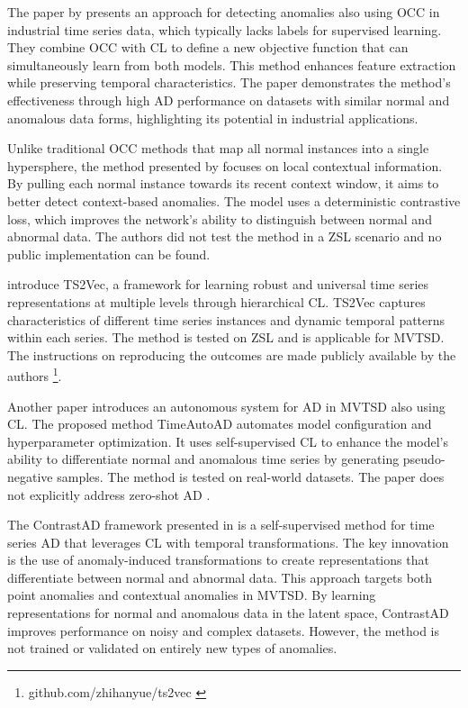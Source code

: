 %
The paper by \cite{lee_time_2023} presents an approach for detecting anomalies also using OCC in industrial time series data, which typically lacks labels for supervised learning. They combine OCC with CL to define a new objective function that can simultaneously learn from both models. This method enhances feature extraction while preserving temporal characteristics. The paper demonstrates the method's effectiveness through high AD performance on datasets with similar normal and anomalous data forms, highlighting its potential in industrial applications.

Unlike traditional OCC methods that map all normal instances into a single hypersphere, the method presented by \cite{chen_time series_2023} focuses on local contextual information. By pulling each normal instance towards its recent context window, it aims to better detect context-based anomalies. The model uses a deterministic contrastive loss, which improves the network's ability to distinguish between normal and abnormal data. The authors did not test the method in a ZSL scenario and no public implementation can be found.

\cite{yue_ts2vec_2022} introduce TS2Vec, a framework for learning robust and universal time series representations at multiple levels through hierarchical CL. TS2Vec captures characteristics of different time series instances and dynamic temporal patterns within each series. The method is tested on ZSL and is applicable for MVTSD. The instructions on reproducing the outcomes are made publicly available by the authors \footnote{\fussy\tiny github.com/zhihanyue/ts2vec \label{foot_ts2vec}}.

Another paper introduces an autonomous system for AD in MVTSD also using CL. The proposed method TimeAutoAD automates model configuration and hyperparameter optimization. It uses self-supervised CL to enhance the model's ability to differentiate normal and anomalous time series by generating pseudo-negative samples. The method is tested on real-world datasets. The paper does not explicitly address zero-shot AD \cite{jiao_timeautoad_2022}.

The ContrastAD framework presented in \cite{li_contrastive_2023} is a self-supervised method for time series AD that leverages CL with temporal transformations. The key innovation is the use of anomaly-induced transformations to create representations that differentiate between normal and abnormal data. This approach targets both point anomalies and contextual anomalies in MVTSD. By learning representations for normal and anomalous data in the latent space, ContrastAD improves performance on noisy and complex datasets. However, the method is not trained or validated on entirely new types of anomalies.

